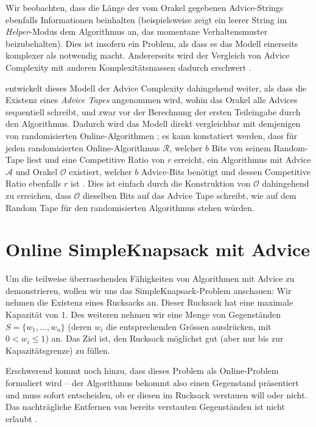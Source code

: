 \documentclass[11pt]{scrreprt} %
\theoremstyle{definition}
\begin{document}
\bigskip

Wir beobachten, dass die Länge der vom Orakel gegebenen Advice-Strings ebenfalls Informationen beinhalten (beispielsweise zeigt ein leerer String im {\sl Helper}-Modus dem Algorithmus an, das momentane Verhaltensmuster beizubehalten). Dies ist insofern ein Problem, als dass es das Modell einerseits komplexer als notwendig macht. Andererseits wird der Vergleich von Advice Complexity mit anderen Komplexitätsmassen dadurch erschwert \cite{BKK}.

\cite{BKKR} entwickelt dieses Modell der Advice Complexity dahingehend weiter, als dass die Existenz eines {\sl Advice Tapes} angenommen wird, wohin das Orakel alle Advices sequentiell schreibt, und zwar vor der Berechnung der ersten Teileingabe durch den Algorithmus. Dadurch wird das Modell direkt vergleichbar mit demjenigen von randomisierten Online-Algorithmen \cite{BKK}; es kann konstatiert werden, dass für jeden randomisierten Online-Algorithmus $\mathcal{R}$, welcher $b$ Bits von seinem Random-Tape liest und eine Competitive Ratio von $r$ erreicht, ein Algorithmus mit Advice $\mathcal{A}$ und Orakel $\mathcal{O}$ existiert, welcher $b$ Advice-Bits benötigt und dessen Competitive Ratio ebenfalls $r$ ist \cite{BKKR}. Dies ist einfach durch die Konstruktion von $\mathcal{O}$ dahingehend zu erreichen, dass $\mathcal{O}$ dieselben Bits auf das Advice Tape schreibt, wie auf dem Random Tape für den randomisierten Algorithmus stehen würden.

\section{Online {\sc SimpleKnapsack} mit Advice}

Um die teilweise überraschenden Fähigkeiten von Algorithmen mit Advice zu demonstrieren, wollen wir uns das {\sc SimpleKnapsack}-Problem anschauen: Wir nehmen die Existenz eines Rucksacks an. Dieser Rucksack hat eine maximale Kapazität von $1$. Des weiteren nehmen wir eine Menge von Gegenständen $S = \{ w_1, \dots, w_n \}$ (deren $w_i$ die entsprechenden Grössen ausdrücken, mit $0 < w_i \le 1$) an. Das Ziel ist, den Rucksack möglichst gut (aber nur bis zur Kapazitätsgrenze) zu füllen.

Erschwerend kommt noch hinzu, dass dieses Problem als Online-Problem formuliert wird -- der Algorithmus bekommt also einen Gegenstand präsentiert und muss sofort entscheiden, ob er diesen im Rucksack verstauen will oder nicht. Das nachträgliche Entfernen von bereits verstauten Gegenständen ist nicht erlaubt \cite{knapsack}.
\end{document}
